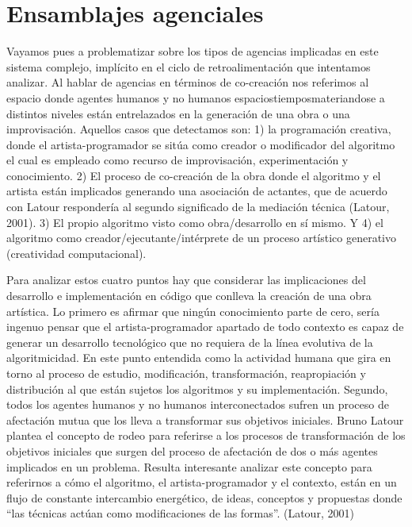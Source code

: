 \section{Ensamblajes agenciales}

Vayamos pues a problematizar sobre los tipos de agencias implicadas en este sistema complejo, implícito en el ciclo de retroalimentación que intentamos analizar. Al hablar de agencias en términos de co-creación nos referimos al espacio donde agentes humanos y no humanos espaciostiemposmateriandose a distintos niveles están entrelazados en la generación de una obra o una improvisación. Aquellos casos que detectamos son: 1) la programación creativa, donde el artista-programador se sitúa como creador o modificador del algoritmo el cual es empleado como recurso de improvisación, experimentación y conocimiento. 2) El proceso de co-creación de la obra donde el algoritmo y el artista están implicados generando una asociación de actantes, que de acuerdo con Latour respondería al segundo significado de la mediación técnica (Latour, 2001). 3) El propio algoritmo visto como obra/desarrollo en sí mismo. Y 4) el algoritmo como creador/ejecutante/intérprete de un proceso artístico generativo (creatividad computacional).

Para analizar estos cuatro puntos hay que considerar las implicaciones del desarrollo e implementación en código que conlleva la creación de una obra artística. Lo primero es afirmar que ningún conocimiento parte de cero, sería ingenuo pensar que el artista-programador apartado de todo contexto es capaz de generar un desarrollo tecnológico que no requiera de la línea evolutiva de la algoritmicidad. En este punto entendida como la actividad humana que gira en torno al proceso de estudio, modificación, transformación, reapropiación y distribución al que están sujetos los algoritmos y su implementación. Segundo, todos los agentes humanos y no humanos interconectados sufren un proceso de afectación mutua que los lleva a transformar sus objetivos iniciales. Bruno Latour plantea el concepto de rodeo para referirse a los procesos de transformación de los objetivos iniciales que surgen del proceso de afectación de dos o más agentes implicados en un problema. Resulta interesante analizar este concepto para referirnos a cómo el algoritmo, el artista-programador y el contexto, están en un flujo de constante intercambio energético, de ideas, conceptos y propuestas donde “las técnicas actúan como modificaciones de las formas”. (Latour, 2001)

